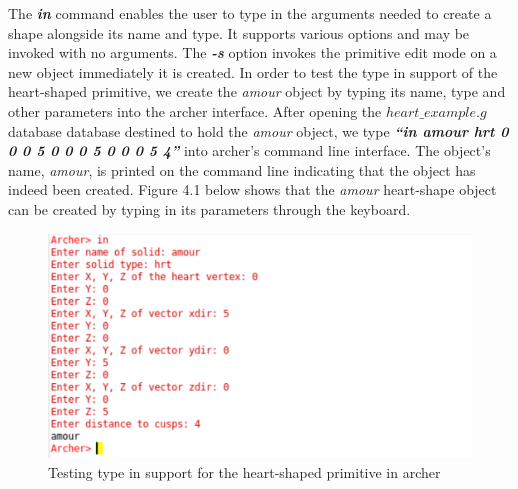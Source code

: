 The   \textit{\textbf{in}}   command   enables   the   user   to   type   in   the   arguments   needed   to   create   a  shape   alongside   its   name   and   type.   It   supports   various   options   and   may   be  
invoked   with   no   arguments.   The   \textit{\textbf{-­s}}   option   invokes   the   primitive   edit   mode   on   a  
new   object   immediately   it   is   created.   In   order   to   test   the   type   in   support   of   the  
heart­-shaped   primitive,   we   create   the   \textit{amour}   object   by   typing   its   name,   type   and  
other   parameters   into   the   archer   interface.   After   opening   the   $heart\_example.g$  
database   database   destined   to   hold   the   \textit{amour}   object,   we   type   \textit{\textbf{“in   amour   hrt   0  
0   0   5   0   0   0   5   0   0   0   5   4”}}   into   archer's   command   line   interface.   The   object's  
name,   \textit{amour},   is   printed   on   the   command ­line   indicating   that   the   object   has  
indeed   been   created. Figure   4.1 below   shows   that   the   \textit{amour}  
heart-­shape object can be created by typing in its parameters through the keyboard.

\begin{figure}[htbp]
\centering
\includegraphics[trim=0.0cm 0.5cm 0.1cm 0.1cm, clip=true, totalheight=0.4\textheight]{Pictures/Typein.png}
\caption[Testing type in support for the heart-­shaped primitive in archer]{Testing type in support for the heart­-shaped primitive in archer}
\label{Typein}
\end{figure}

